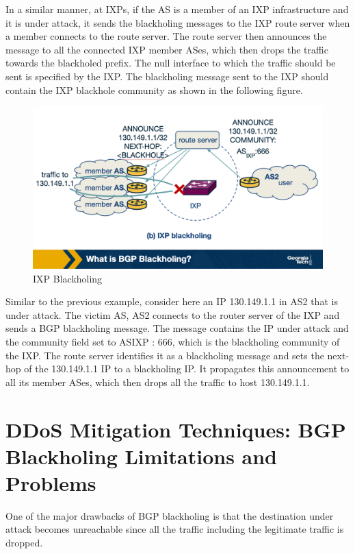 \documentclass[11pt]{article}
\begin{document}
In a similar manner, at IXPs, if the AS is a member of an IXP infrastructure and it is under attack, it sends the blackholing messages to the IXP route server when a member connects to the route server. The route server then announces the message to all the connected IXP member ASes, which then drops the traffic towards the blackholed prefix. The null interface to which the traffic should be sent is specified by the IXP. The blackholing message sent to the IXP should contain the IXP blackhole community as shown in the following figure. 

\begin{figure}[htbp]
\centering
\includegraphics[width=.9\linewidth]{./MD_Figures/9_bgp_blackholing_2.png}
\caption{\label{fig:orgc3e5611}IXP Blackholing}
\end{figure}

Similar to the previous example, consider here an IP 130.149.1.1 in AS2 that is under attack. The victim AS, AS2 connects to the router server of the IXP and sends a BGP blackholing message. The message contains the IP under attack and the community field set to ASIXP : 666, which is the blackholing community of the IXP. The route server identifies it as a blackholing message and sets the next-hop of the 130.149.1.1 IP to a blackholing IP. It propagates this announcement to all its member ASes, which then drops all the traffic to host 130.149.1.1. 


\section{DDoS Mitigation Techniques: BGP Blackholing Limitations and Problems}
\label{sec:orgfce3913}

One of the major drawbacks of BGP blackholing is that the destination under attack becomes unreachable since all the traffic including the legitimate traffic is dropped. 
\end{document}
